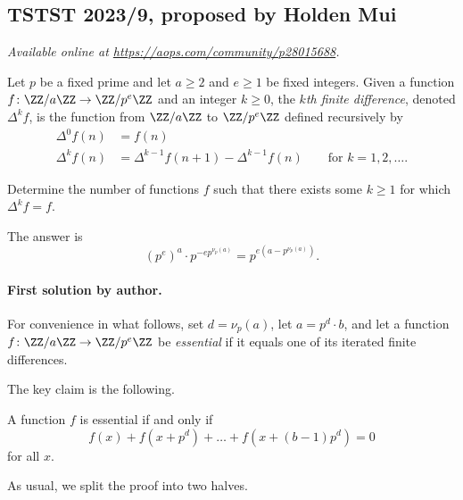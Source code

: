 \documentclass[11pt]{scrartcl}
\begin{document}
\subsection{TSTST 2023/9, proposed by Holden Mui}
\textsl{Available online at \url{https://aops.com/community/p28015688}.}
\begin{mdframed}[style=mdpurplebox,frametitle={Problem statement}]
Let $p$ be a fixed prime and let $a \ge 2$ and $e \ge 1$ be fixed integers.
Given a function $f \colon \ZZ/a\ZZ \to \ZZ/p^e\ZZ$
and an integer $k \ge 0$, the \emph{$k$th finite difference},
denoted $\Delta^k f$, is the function from $\ZZ/a\ZZ$ to $\ZZ/p^e\ZZ$
defined recursively by
\begin{align*}
  \Delta^0 f(n) &= f(n) \\
  \Delta^k f(n) &= \Delta^{k-1} f(n+1) - \Delta^{k-1} f(n)
  \qquad \text{for } k = 1, 2, \dots.
\end{align*}

Determine the number of functions $f$ such that there exists some
$k \ge 1$ for which $\Delta^k f = f$.
\end{mdframed}
The answer is
\[ (p^e)^a \cdot p^{-ep^{\nu_p(a)}} = p^{e(a - p^{\nu_p(a)})}. \]

\paragraph{First solution by author.}
For convenience in what follows, set $d = \nu_p(a)$, let $a = p^d \cdot b$,
and let a function $f\colon \ZZ/a\ZZ \to \ZZ/p^e\ZZ$ be \emph{essential}
if it equals one of its iterated finite differences.

The key claim is the following.
\begin{claim*}
  A function $f$ is essential if and only if
  \begin{equation}\label{p3:ess}
    f(x) + f(x + p^d) + \dots + f(x + (b-1)p^d) = 0
  \end{equation}
  for all $x$.
\end{claim*}
As usual, we split the proof into two halves.
\end{document}
